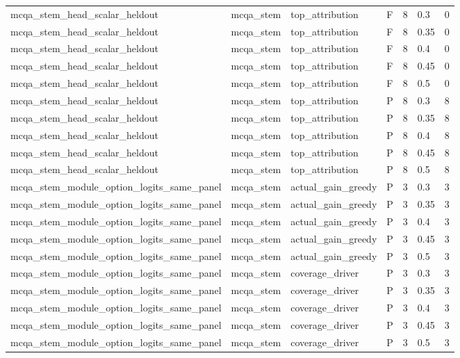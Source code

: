 \begin{tabular}{lllllll}
mcqa\_stem\_head\_scalar\_heldout & mcqa\_stem & top\_attribution & F & 8 & 0.3 & 0 \\
mcqa\_stem\_head\_scalar\_heldout & mcqa\_stem & top\_attribution & F & 8 & 0.35 & 0 \\
mcqa\_stem\_head\_scalar\_heldout & mcqa\_stem & top\_attribution & F & 8 & 0.4 & 0 \\
mcqa\_stem\_head\_scalar\_heldout & mcqa\_stem & top\_attribution & F & 8 & 0.45 & 0 \\
mcqa\_stem\_head\_scalar\_heldout & mcqa\_stem & top\_attribution & F & 8 & 0.5 & 0 \\
mcqa\_stem\_head\_scalar\_heldout & mcqa\_stem & top\_attribution & P & 8 & 0.3 & 8 \\
mcqa\_stem\_head\_scalar\_heldout & mcqa\_stem & top\_attribution & P & 8 & 0.35 & 8 \\
mcqa\_stem\_head\_scalar\_heldout & mcqa\_stem & top\_attribution & P & 8 & 0.4 & 8 \\
mcqa\_stem\_head\_scalar\_heldout & mcqa\_stem & top\_attribution & P & 8 & 0.45 & 8 \\
mcqa\_stem\_head\_scalar\_heldout & mcqa\_stem & top\_attribution & P & 8 & 0.5 & 8 \\
mcqa\_stem\_module\_option\_logits\_same\_panel & mcqa\_stem & actual\_gain\_greedy & P & 3 & 0.3 & 3 \\
mcqa\_stem\_module\_option\_logits\_same\_panel & mcqa\_stem & actual\_gain\_greedy & P & 3 & 0.35 & 3 \\
mcqa\_stem\_module\_option\_logits\_same\_panel & mcqa\_stem & actual\_gain\_greedy & P & 3 & 0.4 & 3 \\
mcqa\_stem\_module\_option\_logits\_same\_panel & mcqa\_stem & actual\_gain\_greedy & P & 3 & 0.45 & 3 \\
mcqa\_stem\_module\_option\_logits\_same\_panel & mcqa\_stem & actual\_gain\_greedy & P & 3 & 0.5 & 3 \\
mcqa\_stem\_module\_option\_logits\_same\_panel & mcqa\_stem & coverage\_driver & P & 3 & 0.3 & 3 \\
mcqa\_stem\_module\_option\_logits\_same\_panel & mcqa\_stem & coverage\_driver & P & 3 & 0.35 & 3 \\
mcqa\_stem\_module\_option\_logits\_same\_panel & mcqa\_stem & coverage\_driver & P & 3 & 0.4 & 3 \\
mcqa\_stem\_module\_option\_logits\_same\_panel & mcqa\_stem & coverage\_driver & P & 3 & 0.45 & 3 \\
mcqa\_stem\_module\_option\_logits\_same\_panel & mcqa\_stem & coverage\_driver & P & 3 & 0.5 & 3 \\

\end{tabular}
